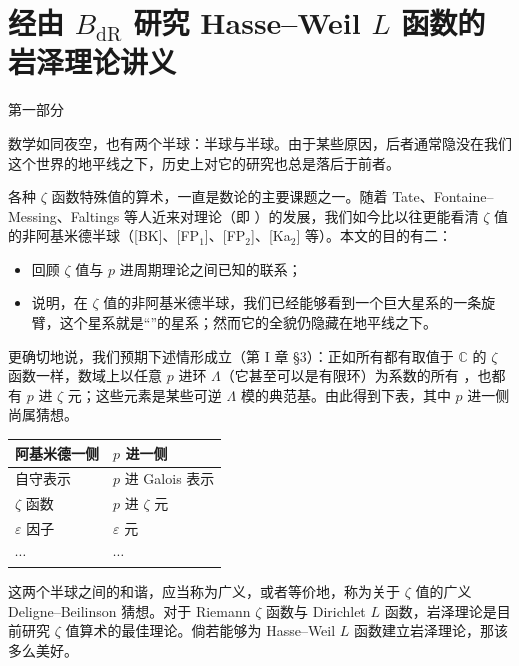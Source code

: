 \chapter{经由 \texorpdfstring{$B_{\mathrm{dR}}$}{BdR} 研究 Hasse--Weil \texorpdfstring{$L$}{L} 函数的岩泽理论讲义}
\begin{center}\large 第一部分\end{center}
数学如同夜空，也有两个半球：半球与半球。由于某些原因，后者通常隐没在我们这个世界的地平线之下，历史上对它的研究也总是落后于前者。

各种 $\zeta$ 函数特殊值的算术，一直是数论的主要课题之一。随着 Tate、Fontaine--Messing、Faltings 等人近来对理论（即 ）的发展，我们如今比以往更能看清 $\zeta$ 值的非阿基米德半球（[BK]、[FP$_1$]、[FP$_2$]、[Ka$_2$] 等）。本文的目的有二：
\begin{itemize}
\item 回顾 $\zeta$ 值与 $p$ 进周期理论之间已知的联系；
\item 说明，在 $\zeta$ 值的非阿基米德半球，我们已经能够看到一个巨大星系的一条旋臂，这个星系就是“”的星系；然而它的全貌仍隐藏在地平线之下。
\end{itemize}
更确切地说，我们预期下述情形成立（第 I 章 §3）：正如所有都有取值于 $\mathbb C$ 的 $\zeta$ 函数一样，数域上以任意 $p$ 进环 $\Lambda$（它甚至可以是有限环）为系数的所有 ，也都有 $p$ 进 $\zeta$ 元；这些元素是某些可逆 $\Lambda$ 模的典范基。由此得到下表，其中 $p$ 进一侧尚属猜想。

\begin{center}
\begin{tabular}{>{\raggedright\arraybackslash}p{.43\linewidth}>{\raggedright\arraybackslash}p{.43\linewidth}}\toprule
阿基米德一侧 & $p$ 进一侧\\\midrule
自守表示 & $p$ 进 Galois 表示\\
$\zeta$ 函数 & $p$ 进 $\zeta$ 元\\
$\varepsilon$ 因子 & $\varepsilon$ 元\\
$\cdots$ & $\cdots$\\\bottomrule
\end{tabular}
\end{center}
这两个半球之间的和谐，应当称为广义，或者等价地，称为关于 $\zeta$ 值的广义 Deligne--Beilinson 猜想。对于 Riemann $\zeta$ 函数与 Dirichlet $L$ 函数，岩泽理论是目前研究 $\zeta$ 值算术的最佳理论。倘若能够为 Hasse--Weil $L$ 函数建立岩泽理论，那该多么美好。

